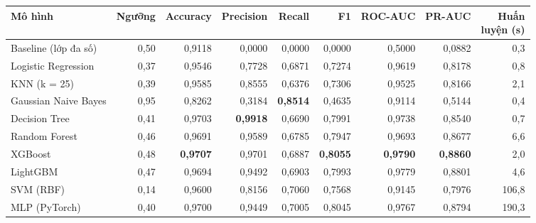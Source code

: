 \begin{tabular}{lrrrrrrrr}
\toprule
Mô hình & Ngưỡng & Accuracy & Precision & Recall & F1 & ROC-AUC & PR-AUC & \makecell[r]{Huấn\\luyện (s)} \\
\midrule
Baseline (lớp đa số) & 0{,}50 & 0{,}9118 & 0{,}0000 & 0{,}0000 & 0{,}0000 & 0{,}5000 & 0{,}0882 & 0{,}3 \\
Logistic Regression & 0{,}37 & 0{,}9546 & 0{,}7728 & 0{,}6871 & 0{,}7274 & 0{,}9619 & 0{,}8178 & 0{,}8 \\
KNN (k = 25) & 0{,}39 & 0{,}9585 & 0{,}8555 & 0{,}6376 & 0{,}7306 & 0{,}9525 & 0{,}8166 & 2{,}1 \\
Gaussian Naive Bayes & 0{,}95 & 0{,}8262 & 0{,}3184 & \textbf{0{,}8514} & 0{,}4635 & 0{,}9114 & 0{,}5144 & 0{,}4 \\
Decision Tree & 0{,}41 & 0{,}9703 & \textbf{0{,}9918} & 0{,}6690 & 0{,}7991 & 0{,}9738 & 0{,}8540 & 0{,}7 \\
Random Forest & 0{,}46 & 0{,}9691 & 0{,}9589 & 0{,}6785 & 0{,}7947 & 0{,}9693 & 0{,}8677 & 6{,}6 \\
XGBoost & 0{,}48 & \textbf{0{,}9707} & 0{,}9701 & 0{,}6887 & \textbf{0{,}8055} & \textbf{0{,}9790} & \textbf{0{,}8860} & 2{,}0 \\
LightGBM & 0{,}47 & 0{,}9694 & 0{,}9492 & 0{,}6903 & 0{,}7993 & 0{,}9779 & 0{,}8801 & 4{,}6 \\
SVM (RBF) & 0{,}14 & 0{,}9600 & 0{,}8156 & 0{,}7060 & 0{,}7568 & 0{,}9145 & 0{,}7976 & 106{,}8 \\
MLP (PyTorch) & 0{,}40 & 0{,}9700 & 0{,}9449 & 0{,}7005 & 0{,}8045 & 0{,}9767 & 0{,}8794 & 190{,}3 \\
\bottomrule
\end{tabular}
